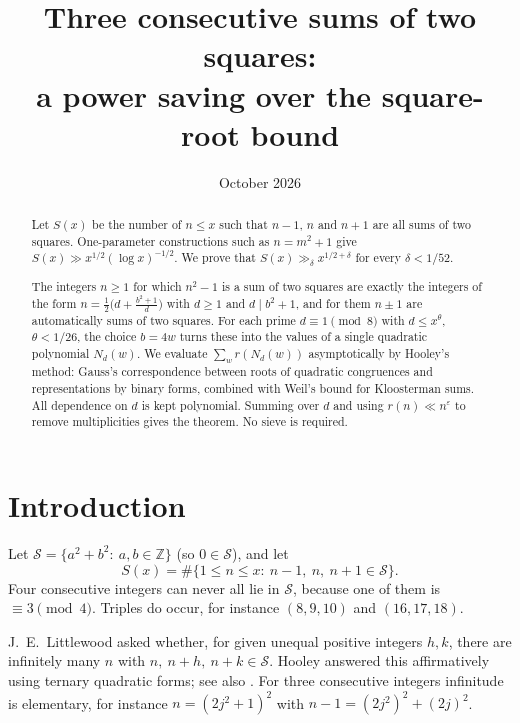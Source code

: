 \documentclass[11pt]{amsart}
\title[Three consecutive sums of two squares]{Three consecutive sums of two squares:\\ a power saving over the square-root bound}
\date{October 2026}
\theoremstyle{remark}
\theoremstyle{definition}
\numberwithin{equation}{section}
\newcommand{\Sc}{\mathcal{S}}
\newcommand{\Z}{\mathbb{Z}}
\newcommand{\eps}{\varepsilon}
\begin{document}
\begin{abstract}
Let $S(x)$ be the number of $n\le x$ such that $n-1$, $n$ and $n+1$ are all sums of two squares. One-parameter constructions such as $n=m^2+1$ give $S(x)\gg x^{1/2}(\log x)^{-1/2}$. We prove that $S(x)\gg_\delta x^{1/2+\delta}$ for every $\delta<1/52$.

The integers $n\ge1$ for which $n^2-1$ is a sum of two squares are exactly the integers of the form $n=\tfrac12\bigl(d+\tfrac{b^2+1}{d}\bigr)$ with $d\ge1$ and $d\mid b^2+1$, and for them $n\pm1$ are automatically sums of two squares. For each prime $d\equiv 1 \pmod 8$ with $d\le x^{\theta}$, $\theta<1/26$, the choice $b=4w$ turns these into the values of a single quadratic polynomial $N_d(w)$. We evaluate $\sum_w r(N_d(w))$ asymptotically by Hooley's method: Gauss's correspondence between roots of quadratic congruences and representations by binary forms, combined with Weil's bound for Kloosterman sums. All dependence on $d$ is kept polynomial. Summing over $d$ and using $r(n)\ll n^{\eps}$ to remove multiplicities gives the theorem. No sieve is required.
\end{abstract}

\maketitle

\section{Introduction}

Let $\Sc=\{a^2+b^2:\ a,b\in\Z\}$ (so $0\in\Sc$), and let
\[
S(x)=\#\{1\le n\le x:\ n-1,\ n,\ n+1\in\Sc\}.
\]
Four consecutive integers can never all lie in $\Sc$, because one of them is $\equiv 3\pmod 4$. Triples do occur, for instance $(8,9,10)$ and $(16,17,18)$.

J.~E.~Littlewood asked whether, for given unequal positive integers $h,k$, there are infinitely many $n$ with $n,\ n+h,\ n+k\in\Sc$. Hooley \cite{Ho73} answered this affirmatively using ternary quadratic forms; see also \cite[\S2.1]{FKR}. For three consecutive integers infinitude is elementary, for instance $n=(2j^2+1)^2$ with $n-1=(2j^2)^2+(2j)^2$.
\end{document}
